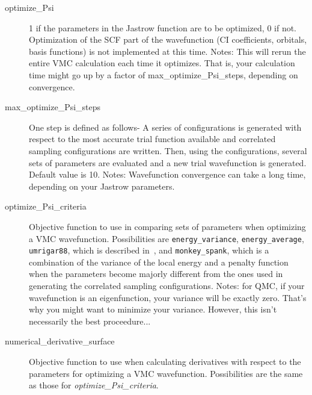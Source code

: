 \documentclass[11pt]{article}
\begin{document}
\begin{description}

\item [optimize\_Psi] 1 if the parameters in the Jastrow function are to
  be optimized, 0 if not.  Optimization of the SCF part of the
  wavefunction (CI coefficients, orbitals, basis functions) is not
  implemented at this time. Notes: This will rerun the entire VMC calculation each time it                                                                                                      
     optimizes. That is, your calculation time might go up by a factor                                                                                                   
     of max\_optimize\_Psi\_steps, depending on convergence.

\item [max\_optimize\_Psi\_steps] One step is defined as follows- A series
  of configurations is generated with respect to the most accurate
  trial function available and correlated sampling configurations are
  written.  Then, using the configurations, several sets of parameters
  are evaluated and a new trial wavefunction is generated.  Default
  value is 10. Notes: Wavefunction convergence can take a long time, depending                                                                                                     
     on your Jastrow parameters.

\item [optimize\_Psi\_criteria] Objective function to use in
  comparing sets of parameters when optimizing a VMC wavefunction.
  Possibilities are \verb-energy_variance-, \verb-energy_average-,
  \verb-umrigar88-, which is described in~\cite{UmrigarWilsonWilkins1988}, and
  \verb-monkey_spank-, which is a combination of the variance of the
  local energy and a penalty function when the parameters become
  majorly different from the ones used in generating the correlated
  sampling configurations. Notes: for QMC, if your wavefunction is an eigenfunction, your                                                                                                      
     variance will be exactly zero. That's why you might want to minimize                                                                                                
     your variance. However, this isn't necessarily the best proceedure...  

\item [numerical\_derivative\_surface] Objective function to use
  when calculating derivatives with respect to the parameters for
  optimizing a VMC wavefunction.  Possibilities are the same as those
  for \emph{optimize\_Psi\_criteria}.


\end{description}
\end{document}
